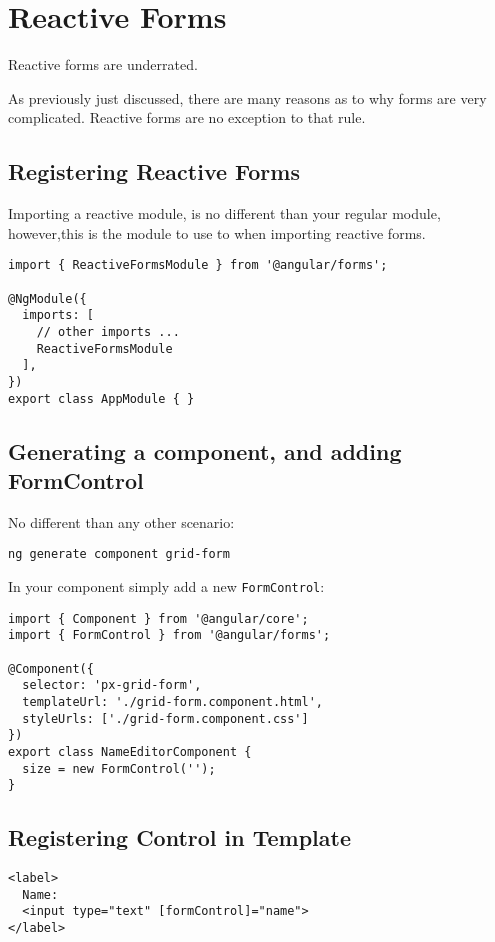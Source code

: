 \chapter{ Reactive Forms }

Reactive forms are underrated.

As previously just discussed, there are many reasons as to why forms are very complicated. Reactive forms are no exception to that rule.

\section{ Registering Reactive Forms }

Importing a reactive module, is no different than your regular module, however,this is the module to use to when importing reactive forms. 

\begin{lstlisting}
import { ReactiveFormsModule } from '@angular/forms';

@NgModule({
  imports: [
    // other imports ...
    ReactiveFormsModule
  ],
})
export class AppModule { }
\end{lstlisting}

\section{Generating a component, and adding FormControl}
No different than any other scenario: 
\begin{verbatim}
ng generate component grid-form 
\end{verbatim}

In your component simply add a new \lstinline{FormControl}: 

\begin{lstlisting}
import { Component } from '@angular/core';
import { FormControl } from '@angular/forms';

@Component({
  selector: 'px-grid-form',
  templateUrl: './grid-form.component.html',
  styleUrls: ['./grid-form.component.css']
})
export class NameEditorComponent {
  size = new FormControl('');
}
\end{lstlisting}

\section{Registering Control in Template}
\begin{lstlisting}
<label>
  Name:
  <input type="text" [formControl]="name">
</label>
\end{lstlisting}

